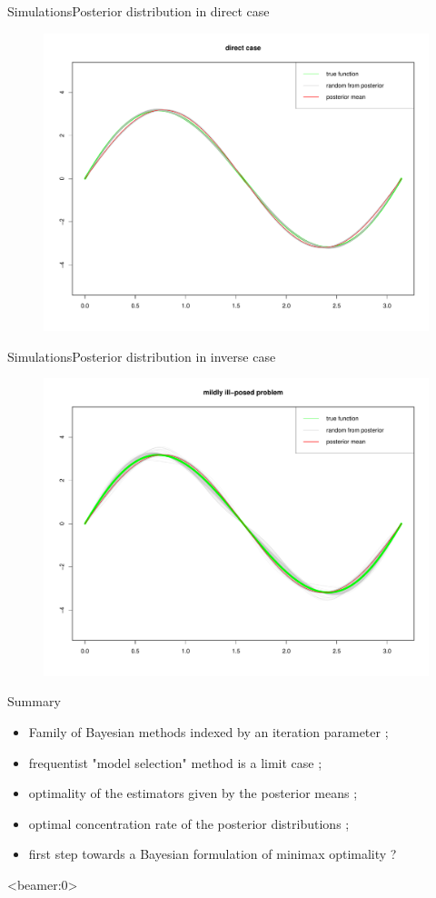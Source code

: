 \documentclass[10pt]{beamer}
\begin{document}
\begin{frame}{Simulations}{Posterior distribution in direct case}
\begin{figure}
\centering
\includegraphics[width=.9\linewidth]{tirage-direct.pdf}
\end{figure}
\end{frame}

\begin{frame}{Simulations}{Posterior distribution in inverse case}
\begin{figure}
\centering
\includegraphics[width=.9\linewidth]{tirage-inverse.pdf}
\end{figure}
\end{frame}

\begin{frame}{Summary}
\begin{itemize}
\setlength\itemsep{2em}
\item Family of Bayesian methods indexed by an iteration parameter ;
\item frequentist "model selection" method  is a limit case ;
\item optimality of the estimators given by the posterior means ;
\item optimal concentration rate of the posterior distributions ;
\item first step towards a Bayesian formulation of minimax optimality ?
\end{itemize}
\end{frame}

\begin{frame}<beamer:0>

\end{frame}

\end{document}
